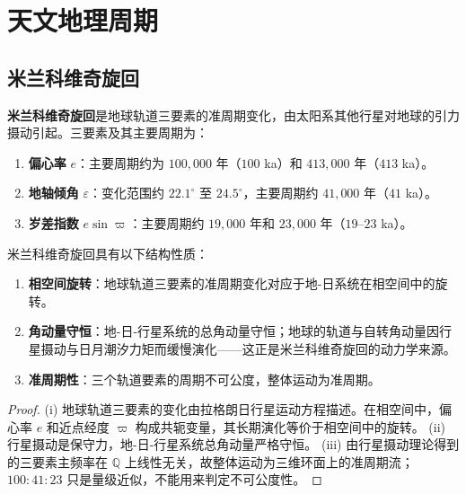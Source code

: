 \section{天文地理周期}
\label{sec:astro_geographic_cycles}

\subsection{米兰科维奇旋回}

\begin{definition}[米兰科维奇旋回]\label{def:milankovitch_cycles}
\textbf{米兰科维奇旋回}是地球轨道三要素的准周期变化，由太阳系其他行星对地球的引力摄动引起。三要素及其主要周期为：
\begin{enumerate}[label=(\roman*)]
    \item \textbf{偏心率} $e$：主要周期约为 $100,000$ 年（$100$ ka）和 $413,000$ 年（$413$ ka）。
    \item \textbf{地轴倾角} $\varepsilon$：变化范围约 $22.1^\circ$ 至 $24.5^\circ$，主要周期约 $41,000$ 年（$41$ ka）。
    \item \textbf{岁差指数} $e\sin\varpi$：主要周期约 $19,000$ 年和 $23,000$ 年（$19$--$23$ ka）。
\end{enumerate}
\end{definition}

\begin{proposition}[米兰科维奇旋回的结构性质]\label{prop:milankovitch_structure}
米兰科维奇旋回具有以下结构性质：
\begin{enumerate}[label=(\roman*)]
    \item \textbf{相空间旋转}：地球轨道三要素的准周期变化对应于地-日系统在相空间中的旋转。
    \item \textbf{角动量守恒}：地-日-行星系统的总角动量守恒；地球的轨道与自转角动量因行星摄动与日月潮汐力矩而缓慢演化——这正是米兰科维奇旋回的动力学来源。
    \item \textbf{准周期性}：三个轨道要素的周期不可公度，整体运动为准周期。
\end{enumerate}
\end{proposition}

\begin{proof}
(i) 地球轨道三要素的变化由拉格朗日行星运动方程描述。在相空间中，偏心率 $e$ 和近点经度 $\varpi$ 构成共轭变量，其长期演化等价于相空间中的旋转。
(ii) 行星摄动是保守力，地-日-行星系统总角动量严格守恒。
(iii) 由行星摄动理论得到的三要素主频率在 $\mathbb{Q}$ 上线性无关，故整体运动为三维环面上的准周期流；$100:41:23$ 只是量级近似，不能用来判定不可公度性。
\end{proof}

